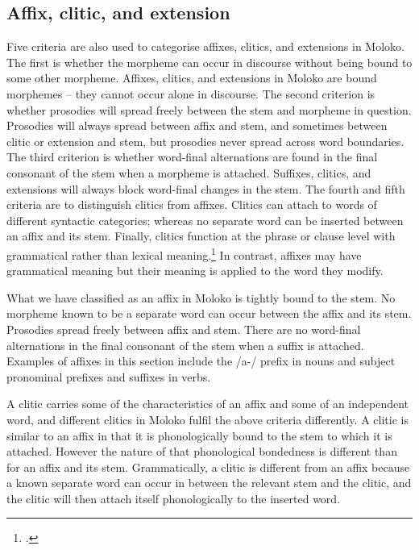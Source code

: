 \subsection{Affix, clitic, and extension}\label{sec:2.6.2}
\hypertarget{RefHeading1210781525720847}{}
Five criteria are also used to categorise affixes, clitics, and extensions in Moloko. The first is whether the morpheme can occur in discourse without being bound to some other morpheme. Affixes, clitics, and extensions in Moloko are bound morphemes -- they cannot occur alone in discourse. The second criterion is whether prosodies will spread freely between the stem and morpheme in question. Prosodies will always spread between affix and stem, and sometimes between clitic or extension and stem, but prosodies never spread across word boundaries. The third criterion is whether word-final alternations are found in the final consonant of the stem when a morpheme is attached. Suffixes, clitics, and extensions will always block word-final changes in the stem. The fourth and fifth criteria are to distinguish clitics from affixes. Clitics can attach to words of different syntactic categories; whereas no separate word can be inserted between an affix and its stem. Finally, clitics function at the phrase or clause level with grammatical rather than lexical meaning.\footnote{\citealt[22]{Payne1997}.} In contrast, affixes may have grammatical meaning but their meaning is applied to the word they modify. 

What we have classified as an affix in Moloko is tightly bound to the stem. No morpheme known to be a separate word can occur between the affix and its stem. Prosodies spread freely between affix and stem. There are no word-final alternations in the final consonant of the stem when a suffix is attached. Examples of affixes in this section include the /a-/ prefix in nouns and subject pronominal prefixes and suffixes in verbs. 

A clitic carries some of the characteristics of an affix and some of an independent word, and different clitics in Moloko fulfil the above criteria differently. A clitic is similar to an affix in that it is phonologically bound to the stem to which it is attached. However the nature of that phonological bondedness is different than for an affix and its stem. Grammatically, a clitic is different from an affix because a known separate word can occur in between the relevant stem and the clitic, and the clitic will then attach itself phonologically to the inserted word.  


